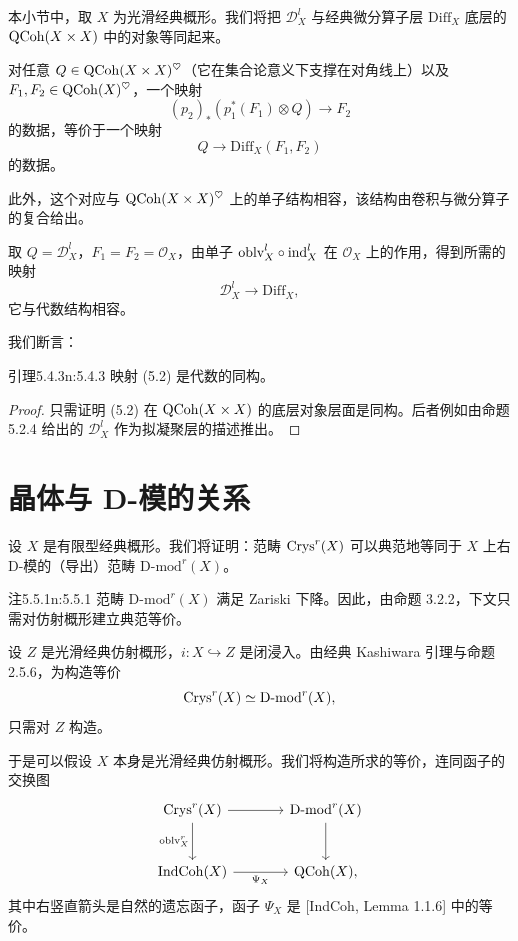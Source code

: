 本小节中，取 $X$ 为光滑经典概形。我们将把 $\mathcal{D}^l_X$ 与经典微分算子层 $\mathrm{Diff}_X$ 底层的 $\mathrm{QCoh}(X\times X)$ 中的对象等同起来。

对任意 $Q\in\mathrm{QCoh}(X\times X)^{\heartsuit}$（它在集合论意义下支撑在对角线上）以及 $F_1,F_2\in\mathrm{QCoh}(X)^{\heartsuit}$，一个映射
\[
(p_2)_*(p_1^*(F_1)\otimes Q)\to F_2
\]
的数据，等价于一个映射
\[
Q\to\mathrm{Diff}_X(F_1,F_2)
\]
的数据。

此外，这个对应与 $\mathrm{QCoh}(X\times X)^{\heartsuit}$ 上的单子结构相容，该结构由卷积与微分算子的复合给出。

取 $Q=\mathcal{D}^l_X$，$F_1=F_2=\mathcal{O}_X$，由单子 $\mathrm{oblv}^l_X\circ\mathrm{ind}^l_X$ 在 $\mathcal{O}_X$ 上的作用，得到所需的映射
\begin{equation}
\mathcal{D}^l_X\to\mathrm{Diff}_X,\tag{5.2}
\end{equation}
它与代数结构相容。

我们断言：

\begin{othm}{引理}{5.4.3}{n:5.4.3}
映射 (5.2) 是代数的同构。
\end{othm}

\begin{proof}
只需证明 (5.2) 在 $\mathrm{QCoh}(X\times X)$ 的底层对象层面是同构。后者例如由命题 5.2.4 给出的 $\mathcal{D}^l_X$ 作为拟凝聚层的描述推出。
\end{proof}

\section{晶体与 D-模的关系}

设 $X$ 是有限型经典概形。我们将证明：范畴 $\mathrm{Crys}^r(X)$ 可以典范地等同于 $X$ 上右 D-模的（导出）范畴 $\mathrm{D\text{-}mod}^r(X)$。

\begin{othm}{注}{5.5.1}{n:5.5.1}
范畴 $\mathrm{D\text{-}mod}^r(X)$ 满足 Zariski 下降。因此，由命题 3.2.2，下文只需对仿射概形建立典范等价。
\end{othm}

设 $Z$ 是光滑经典仿射概形，$i:X\hookrightarrow Z$ 是闭浸入。由经典 Kashiwara 引理与命题 2.5.6，为构造等价
\[
\mathrm{Crys}^r(X)\simeq\mathrm{D\text{-}mod}^r(X),
\]
只需对 $Z$ 构造。

于是可以假设 $X$ 本身是光滑经典仿射概形。我们将构造所求的等价，连同函子的交换图
\[
\begin{tikzcd}[column sep=large, row sep=large]
 \Crys^r(X) \arrow[r] \arrow[d, "\oblv^r_X"'] & \mathrm{D\text{-}mod}^r(X) \arrow[d] \\
 \IndCoh(X) \arrow[r, "\Psi_X"'] & \QCoh(X),
\end{tikzcd}
\]
其中右竖直箭头是自然的遗忘函子，函子 $\Psi_X$ 是 [IndCoh, Lemma 1.1.6] 中的等价。

